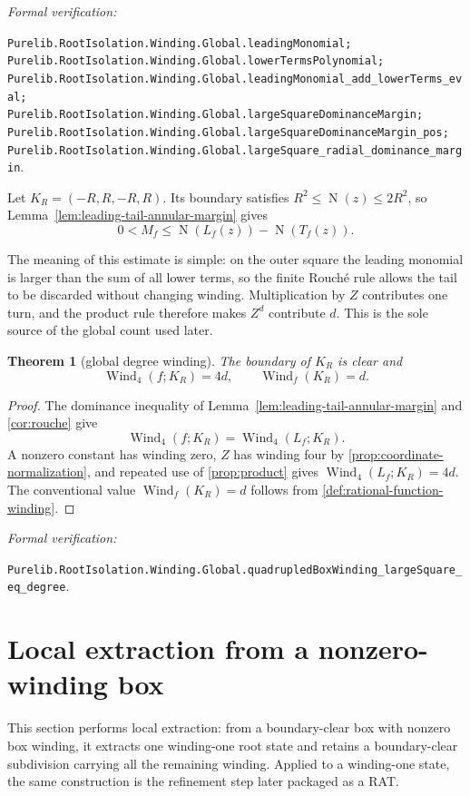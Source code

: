 \documentclass[11pt]{article}
\newtheorem{theorem}{Theorem}[section]
\newcommand{\Norm}[1]{\operatorname{N}\!\left(#1\right)}
\newcommand{\Wind}{\operatorname{Wind}}
\newcommand{\leanref}[1]{\par\smallskip\noindent
  \emph{Formal verification:}\par\nobreak
  {\raggedright\nolinkurl{#1}.\par}}
\begin{document}
\leanref{Purelib.RootIsolation.Winding.Global.leadingMonomial;
Purelib.RootIsolation.Winding.Global.lowerTermsPolynomial;
Purelib.RootIsolation.Winding.Global.leadingMonomial_add_lowerTerms_eval;
Purelib.RootIsolation.Winding.Global.largeSquareDominanceMargin;
Purelib.RootIsolation.Winding.Global.largeSquareDominanceMargin_pos;
Purelib.RootIsolation.Winding.Global.largeSquare_radial_dominance_margin}

Let $K_R=(-R,R,-R,R)$.  Its boundary satisfies
$R^2\le\Norm z\le2R^2$, so
Lemma~\ref{lem:leading-tail-annular-margin} gives
\[
       0<M_f\le\Norm{L_f(z)}-\Norm{T_f(z)}.
\]

The meaning of this estimate is simple: on the outer square the leading
monomial is larger than the sum of all lower terms, so the finite Rouché rule
allows the tail to be discarded without changing winding.  Multiplication by
$Z$ contributes one turn, and the product rule therefore makes $Z^d$
contribute $d$.  This is the sole source of the global count used later.

\begin{theorem}[global degree winding]
\label{thm:global-wind}
The boundary of $K_R$ is clear and
\[
             \Wind_4(f;K_R)=4d,\qquad \Wind_f(K_R)=d.
\]
\end{theorem}

\begin{proof}
The dominance inequality of Lemma~\ref{lem:leading-tail-annular-margin} and
\cref{cor:rouche} give
\[
                 \Wind_4(f;K_R)=\Wind_4(L_f;K_R).
\]
A nonzero constant has winding zero, $Z$ has winding four by
\cref{prop:coordinate-normalization}, and repeated use of
\cref{prop:product} gives $\Wind_4(L_f;K_R)=4d$.  The conventional value
$\Wind_f(K_R)=d$ follows from
\cref{def:rational-function-winding}.
\end{proof}

\leanref{Purelib.RootIsolation.Winding.Global.quadrupledBoxWinding_largeSquare_eq_degree}

\section{Local extraction from a nonzero-winding box}
\label{sec:local-extraction}

This section performs local extraction: from a boundary-clear box with
nonzero box winding, it extracts one winding-one root state and retains a
boundary-clear subdivision carrying all the remaining winding.  Applied to
a winding-one state, the same construction is the refinement step later
packaged as a RAT.
\end{document}
